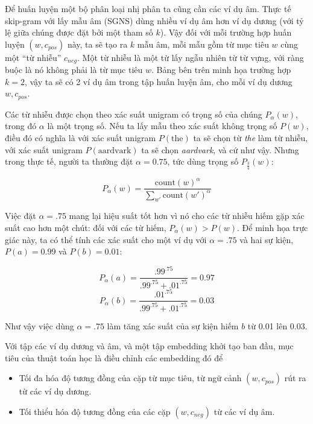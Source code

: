 Để huấn luyện một bộ phân loại nhị phân ta cũng cần các ví dụ âm. Thực tế skip-gram với lấy mẫu âm (SGNS) dùng nhiều ví dụ âm hơn ví dụ dương (với tỷ lệ giữa chúng được đặt bởi một tham số $k$). Vậy đối với mỗi trường hợp huấn luyện $(w, c_{pos})$ này, ta sẽ tạo ra $k$ mẫu âm, mỗi mẫu gồm từ mục tiêu $w$ cùng một ``từ nhiễu'' $c_{neg}$. Một từ nhiễu là một từ lấy ngẫu nhiên từ từ vựng, với ràng buộc là nó không phải là từ mục tiêu $w$. Bảng bên trên minh họa trường hợp $k=2$, vậy ta sẽ có 2 ví dụ âm trong tập huấn luyện âm, cho mỗi ví dụ dương $w, c_{pos}$.

Các từ nhiễu được chọn theo xác suất unigram có trọng số của chúng $P_{\alpha}(w)$, trong đó $\alpha$ là một trọng số. Nếu ta lấy mẫu theo xác suất không trọng số $P(w)$, điều đó có nghĩa là với xác suất unigram $P(\text{the})$ ta sẽ chọn từ \emph{the} làm từ nhiễu, với xác suất unigram $P(\text{aardvark})$ ta sẽ chọn \emph{aardvark}, và cứ như vậy. Nhưng trong thực tế, người ta thường đặt $\alpha = 0.75$, tức dùng trọng số $P_{\frac{3}{4}}(w)$:

\begin{equation}
P_{\alpha}(w) = \frac{\text{count}(w)^{\alpha}}{\sum_{w'} \text{count}(w')^{\alpha}} \tag{5.19}
\end{equation}

Việc đặt $\alpha = .75$ mang lại hiệu suất tốt hơn vì nó cho các từ nhiễu hiếm gặp xác suất cao hơn một chút: đối với các từ hiếm, $P_{\alpha}(w) > P(w)$. Để minh họa trực giác này, ta có thể tính các xác suất cho một ví dụ với $\alpha = .75$ và hai sự kiện, $P(a) = 0.99$ và $P(b) = 0.01$:

\begin{equation}
P_{\alpha}(a) = \frac{.99^{.75}}{.99^{.75}+.01^{.75}} = 0.97 \tag{5.20}
\end{equation}
$$
P_{\alpha}(b) = \frac{.01^{.75}}{.99^{.75}+.01^{.75}} = 0.03
$$

Như vậy việc dùng $\alpha = .75$ làm tăng xác suất của sự kiện hiếm $b$ từ 0.01 lên 0.03.

Với tập các ví dụ dương và âm, và một tập embedding khởi tạo ban đầu, mục tiêu của thuật toán học là điều chỉnh các embedding đó để

\begin{itemize}
  \item Tối đa hóa độ tương đồng của cặp từ mục tiêu, từ ngữ cảnh $(w, c_{pos})$ rút ra từ các ví dụ dương.
  \item Tối thiểu hóa độ tương đồng của các cặp $(w, c_{neg})$ từ các ví dụ âm.
\end{itemize}

